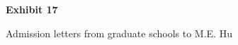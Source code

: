 \documentclass{article}
\begin{document}
% 

% 

% 

% 

% 

% 

% 

% 

% 

% 

% 

% 



\vspace*{\fill}
\begin{center}

{\LARGE \bf
Exhibit 17
}

\vspace{10\baselineskip}

{\large Admission letters from graduate schools to M.E. Hu}

\end{center}
\vspace*{\fill}

% 

% 

% 
\end{document}
